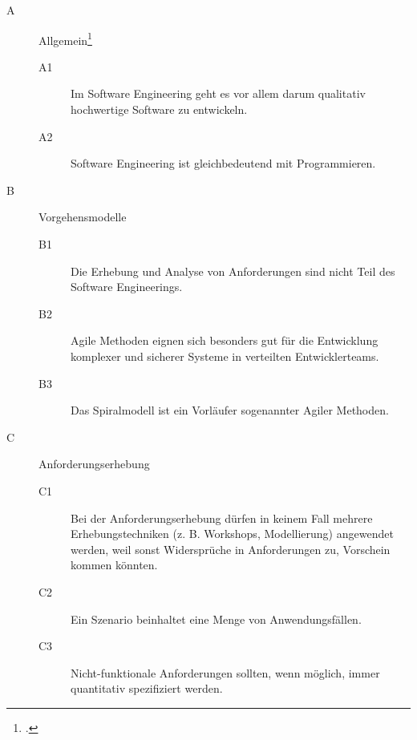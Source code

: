 \documentclass{lehramt-informatik-aufgabe}
\begin{document}
\begin{description}

%

\item[A] Allgemein\footcite[Thema 2 Teilaufgabe 2 Aufgabe 1]{examen:66116:2016:09}

\begin{description}
\item[A1] Im Software Engineering
geht es vor allem darum qualitativ hochwertige Software zu entwickeln.

\item[A2] Software Engineering ist gleichbedeutend mit
Programmieren.
\end{description}

%

\item[B] Vorgehensmodelle

\begin{description}
\item[B1] Die Erhebung und Analyse von Anforderungen sind nicht Teil des
Software Engineerings.

\item[B2] Agile Methoden eignen sich besonders gut
für die Entwicklung komplexer und sicherer Systeme in verteilten
Entwicklerteams.

\item[B3] Das Spiralmodell ist ein Vorläufer
sogenannter Agiler Methoden.
\end{description}

%

\item[C] Anforderungserhebung

\begin{description}
\item[C1] Bei der Anforderungserhebung dürfen in keinem Fall mehrere
Erhebungstechniken (z. B. Workshops, Modellierung) angewendet werden,
weil sonst Widersprüche in Anforderungen zu, Vorschein kommen könnten.

\item[C2] Ein Szenario beinhaltet eine Menge von Anwendungsfällen.

\item[C3] Nicht-funktionale Anforderungen sollten, wenn möglich, immer quantitativ spezifiziert
werden.
\end{description}


\end{description}
\end{document}
